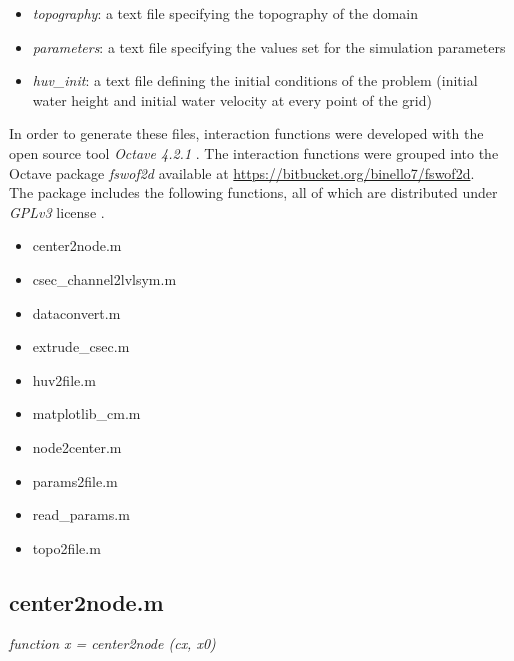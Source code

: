 \begin{itemize}
\itemsep0em
  \item \textit{topography}: a text file specifying the topography of the domain
  \item \textit{parameters}: a text file specifying the values set for the simulation parameters
  \item \textit{huv\_init}: a text file defining the initial conditions of the problem (initial water height and initial water velocity at every point of the grid)
\end{itemize}

In order to generate these files, interaction functions were developed with the open source tool \textit{Octave 4.2.1} \autocite{octave_community_gnu_2018}.
The interaction functions were grouped into the Octave package \textit{fswof2d} available at \url{https://bitbucket.org/binello7/fswof2d}.\\

The package includes the following functions, all of which are distributed under \textit {GPLv3} license \autocite{smith_quick_2014}.

\begin{itemize}
\itemsep0em
  \item center2node.m
  \item csec\_channel2lvlsym.m
  \item dataconvert.m
  \item extrude\_csec.m
  \item huv2file.m
  \item matplotlib\_cm.m
  \item node2center.m
  \item params2file.m
  \item read\_params.m
  \item topo2file.m
\end{itemize}

\subsection*{center2node.m}
\textit{function x = center2node (cx, x0)}\\



